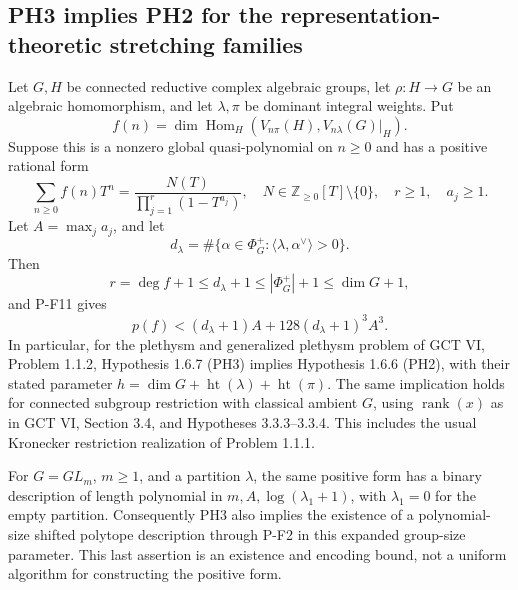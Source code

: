\subsection{PH3 implies PH2 for the representation-theoretic stretching families}

\begin{proposition}
\label{prop:ph3ph2}
Let $G,H$ be connected reductive complex algebraic groups, let
$\rho:H\to G$ be an algebraic homomorphism, and let $\lambda,\pi$ be
dominant integral weights. Put
\[
 f(n)=\dim\operatorname{Hom}_H
       (V_{n\pi}(H),V_{n\lambda}(G)|_H).
\]
Suppose this is a nonzero global quasi-polynomial on $n\ge0$ and has a
positive rational form
\[
 \sum_{n\ge0}f(n)T^n
 =\frac{N(T)}{\prod_{j=1}^{r}(1-T^{a_j})},
 \quad N\in\mathbb Z_{\ge0}[T]\setminus\{0\},\quad r\ge1,
 \quad a_j\ge1.
\]
Let $A=\max_j a_j$, and let
\[
 d_\lambda
 =\#\{\alpha\in\Phi_G^+:\langle\lambda,\alpha^\vee\rangle>0\}.
\]
Then
\[
 r=\deg f+1\le d_\lambda+1\le|\Phi_G^+|+1\le\dim G+1,
\]
and P-F11 gives
\[
 p(f)<(d_\lambda+1)A+128(d_\lambda+1)^3A^3.
 \tag{P-F12a}
\]
In particular, for the plethysm and generalized plethysm problem of
GCT VI, Problem 1.1.2, Hypothesis 1.6.7 (PH3) implies Hypothesis 1.6.6
(PH2), with their stated parameter
$h=\dim G+\operatorname{ht}(\lambda)+\operatorname{ht}(\pi)$.
The same implication holds for connected subgroup restriction with
classical ambient $G$, using $\operatorname{rank}(x)$ as in GCT VI,
Section 3.4, and Hypotheses 3.3.3--3.3.4. This includes the usual
Kronecker restriction realization of Problem 1.1.1.

For $G=GL_m$, $m\ge1$, and a partition $\lambda$, the same positive form has a
binary description of length polynomial in
$m,A,\log(\lambda_1+1)$, with $\lambda_1=0$ for the empty partition.
Consequently PH3 also implies the existence of a polynomial-size shifted
polytope description through P-F2 in this expanded group-size parameter.
This last assertion is an existence and encoding bound, not a uniform
algorithm for constructing the positive form.
\end{proposition}

